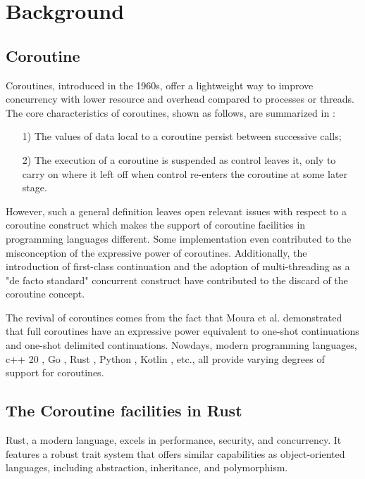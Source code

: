 \documentclass[conference]{IEEEtran}
\begin{document}
\section{Background}
\label{section: Background}

\subsection{Coroutine}

Coroutines, introduced in the 1960s, offer a lightweight way to improve concurrency with lower resource and overhead compared to processes or threads. The core characteristics of coroutines, shown as follows, are summarized in \cite{1980Coroutines}:

\begin{itemize}[leftmargin=*]
  \item[1)] The values of data local to a coroutine persist between successive calls;
  \item[2)] The execution of a coroutine is suspended as control leaves it, only to carry on where it left off when control re-enters the coroutine at some later stage.
\end{itemize}

However, such a general definition leaves open relevant issues with respect to a coroutine construct which makes the support of coroutine facilities in programming languages different. Some implementation even contributed to the misconception of the expressive power of coroutines. Additionally, the introduction of first-class continuation and the adoption of multi-threading as a "de facto standard" concurrent construct have contributed to the discard of the coroutine concept.

The revival of coroutines comes from the fact that Moura et al. \cite{2009Revisiting} demonstrated that full coroutines have an expressive power equivalent to one-shot continuations and one-shot delimited continuations. Nowdays, modern programming languages, c++ 20 \cite{C++20-coroutine}, Go \cite{goroutines}, Rust \cite{rosendahl2017green}, Python \cite{python-coroutine}, Kotlin \cite{kotlin-coroutines}, etc., all provide varying degrees of support for coroutines.

\subsection{The Coroutine facilities in Rust}
\label{subsection: rust_async}

Rust, a modern language, excels in performance, security, and concurrency. It features a robust trait system that offers similar capabilities as object-oriented languages, including abstraction, inheritance, and polymorphism.
\end{document}
